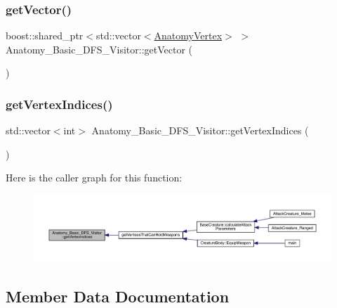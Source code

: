 \subsubsection{\texorpdfstring{get\+Vector()}{getVector()}}
{\footnotesize\ttfamily boost\+::shared\+\_\+ptr$<$std\+::vector$<$\mbox{\hyperlink{_body_graph_8hpp_aeb92fc7b3eed88cf25a4fc7b708a66cf}{Anatomy\+Vertex}}$>$ $>$ Anatomy\+\_\+\+Basic\+\_\+\+D\+F\+S\+\_\+\+Visitor\+::get\+Vector (\begin{DoxyParamCaption}{ }\end{DoxyParamCaption})\hspace{0.3cm}{\ttfamily [inline]}}

\mbox{\label{class_anatomy___basic___d_f_s___visitor_aa4d4a9a684cd4ab15c965d3044530b76}} 
\subsubsection{\texorpdfstring{get\+Vertex\+Indices()}{getVertexIndices()}}
{\footnotesize\ttfamily std\+::vector$<$int$>$ Anatomy\+\_\+\+Basic\+\_\+\+D\+F\+S\+\_\+\+Visitor\+::get\+Vertex\+Indices (\begin{DoxyParamCaption}{ }\end{DoxyParamCaption})\hspace{0.3cm}{\ttfamily [inline]}}

Here is the caller graph for this function\+:
\nopagebreak
\begin{figure}[H]
\begin{center}
\leavevmode
\includegraphics[width=350pt]{d5/db3/class_anatomy___basic___d_f_s___visitor_aa4d4a9a684cd4ab15c965d3044530b76_icgraph}
\end{center}
\end{figure}


\subsection{Member Data Documentation}
\mbox{\label{class_anatomy___basic___d_f_s___visitor_a0b28d945f501686b8037b49bb9ab75b2}} 
